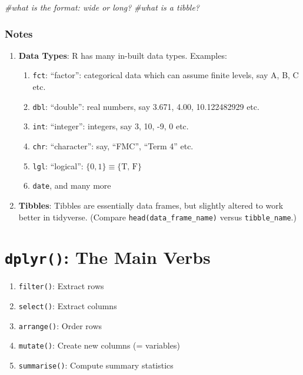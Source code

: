 \documentclass[12pt,]{article}
\newenvironment{Shaded}{\begin{snugshade}}{\end{snugshade}}
\newcommand{\CommentTok}[1]{\textcolor[rgb]{0.56,0.35,0.01}{\textit{#1}}}
\providecommand{\tightlist}{%
  \setlength{\itemsep}{0pt}\setlength{\parskip}{0pt}}
\begin{document}
\begin{Shaded}
\begin{Highlighting}[]
\CommentTok{#what is the format: wide or long?}
\CommentTok{#what is a tibble?}
\end{Highlighting}
\end{Shaded}

\subsubsection{Notes}\label{notes}

\begin{enumerate}
\def\labelenumi{\arabic{enumi}.}
\tightlist
\item
  \textbf{Data Types}: R has many in-built data types. Examples:

  \begin{enumerate}
  \def\labelenumii{\roman{enumii}.}
  \tightlist
  \item
    \texttt{fct}: ``factor'': categorical data which can assume finite
    levels, say A, B, C etc.
  \item
    \texttt{dbl}: ``double'': real numbers, say 3.671, 4.00,
    10.122482929 etc.
  \item
    \texttt{int}: ``integer'': integers, say 3, 10, -9, 0 etc.
  \item
    \texttt{chr}: ``character'': say, ``FMC'', ``Term 4'' etc.
  \item
    \texttt{lgl}: ``logical'': \(\{0, 1\}\equiv \{\text{T, F}\}\)
  \item
    \texttt{date}, and many more
  \end{enumerate}
\item
  \textbf{Tibbles}: Tibbles are essentially data frames, but slightly
  altered to work better in tidyverse. (Compare
  \texttt{head(data\_frame\_name)} versus \texttt{tibble\_name}.)
\end{enumerate}

\section{\texorpdfstring{\texttt{dplyr()}: The Main
Verbs}{dplyr(): The Main Verbs}}\label{dplyr-the-main-verbs}

\begin{enumerate}
\def\labelenumi{\arabic{enumi}.}
\tightlist
\item
  \texttt{filter()}: Extract rows
\item
  \texttt{select()}: Extract columns
\item
  \texttt{arrange()}: Order rows
\item
  \texttt{mutate()}: Create new columns (= variables)
\item
  \texttt{summarise()}: Compute summary statistics
\end{enumerate}
\end{document}
